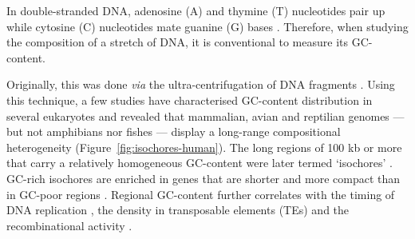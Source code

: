 %
%

In double-stranded DNA, adenosine (A) and thymine (T) nucleotides pair up while cytosine (C) nucleotides mate guanine (G) bases \citep[reviewed in \citealp{kresge2005chargaff}]{chargaff1950chemical}.
Therefore, when studying the composition of a stretch of DNA, it is conventional to measure its GC-content.

Originally, this was done \textit{via} the ultra-centrifugation of DNA fragments \citep{meselson1957equilibrium,corneo1968isolation}.
Using this technique, a few studies have characterised GC-content distribution in several eukaryotes \citep{filipski1973analysis,thiery1976analysis,macaya1976approach,macaya1978analysis,cortadas1977analysis} and revealed that mammalian, avian and reptilian genomes — but not amphibians nor fishes \citep{bernardi1990compositional} — display a long-range compositional heterogeneity (Figure~\ref{fig:isochores-human}).
The long regions of 100 kb or more that carry a relatively homogeneous GC-content were later termed ‘isochores’ \citep{cuny1981major}.\\


GC-rich isochores are enriched in genes \citep[reviewed in \citealp{bernardi2005distribution}]{bernardi1985mosaic,mouchiroud1991distribution,lander2001initial} that are shorter and more compact than in GC-poor regions \citep{duret1995statistical}.
Regional GC-content further correlates with the timing of DNA replication \citep{federico1998generichest,watanabe2002chromosomewide,costantini2008replication}, the density in transposable elements (TEs) \citep{smit1999interspersed,lander2001initial,mousegenomesequencingconsortium2002initial} and the recombinational activity \citep{fullerton2001local,kong2002highresolution}.\\


